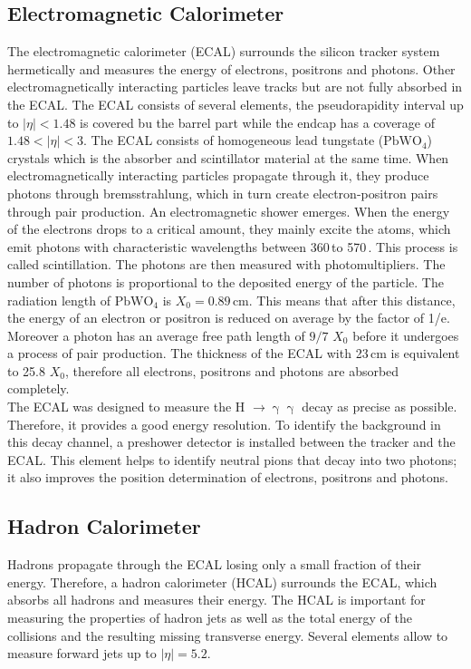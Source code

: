 \subsection*{Electromagnetic Calorimeter}
The electromagnetic calorimeter (ECAL) \cite{ECAL} surrounds the silicon tracker system hermetically and measures the energy of electrons, positrons and photons. Other electromagnetically interacting particles leave tracks but are not fully absorbed in the ECAL. The ECAL consists of several elements, the pseudorapidity interval up to $|\eta|<1.48$ is covered bu the barrel part while the endcap has a coverage of $1.48 < |\eta| < 3 $. The ECAL consists of homogeneous lead tungstate ($\textrm{PbWO}_4$) crystals which is the absorber and scintillator material at the same time. When electromagnetically interacting particles propagate through it, they produce photons through bremsstrahlung, which in turn create electron-positron pairs through pair production. An electromagnetic shower emerges. When the energy of the electrons drops to a critical amount, they mainly excite the atoms, which emit photons with characteristic wavelengths between 360\,\nm to 570\,\nm. This process is called scintillation. The photons are then measured with photomultipliers. The number of photons is proportional to the deposited energy of the particle. The radiation length of $\textrm{PbWO}_4$ is $X_0=0.89$\,cm. This means that after this distance, the energy of an electron or positron is reduced on average by the factor of 1/e. Moreover a photon has an average free path length of $9/7$ $X_0$ before it undergoes a process of pair production. The thickness of the ECAL with 23\,cm is equivalent to 25.8 $X_0$, therefore all electrons, positrons and photons are absorbed completely. \\

The ECAL was designed to measure the H $\rightarrow \upgamma \upgamma$ decay as precise as possible. Therefore, it provides a good energy resolution. To identify the background in this decay channel, a preshower detector is installed between the tracker and the ECAL. This element helps to identify neutral pions that decay into two photons; it also improves the position determination of electrons, positrons and photons. 

\subsection*{Hadron Calorimeter}
Hadrons propagate through the ECAL losing only a small fraction of their energy. Therefore, a hadron calorimeter (HCAL) \cite{HCAL} surrounds the ECAL, which absorbs all hadrons and measures their energy. The HCAL is important for measuring the properties of hadron jets as well as the total energy of the collisions and the resulting missing transverse energy. Several elements allow to measure forward jets up to $|\eta| = 5.2$. \\

